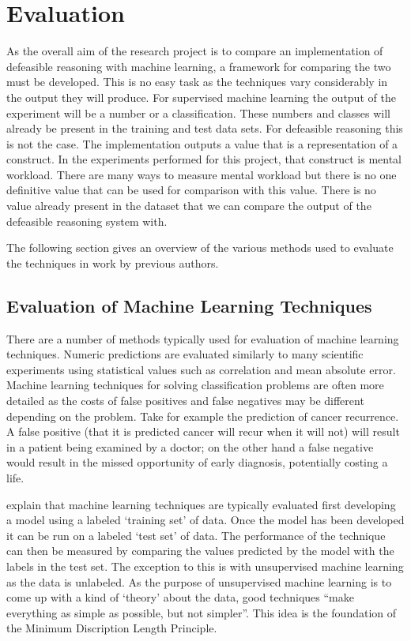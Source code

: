 \section{Evaluation}
\label{sec:evaluation}
As the overall aim of the research project is to compare an implementation of defeasible reasoning with machine learning, a framework for comparing the two must be developed. This is no easy task as the techniques vary considerably in the output they will produce. For supervised machine learning the output of the experiment will be a number or a classification. These numbers and classes will already be present in the training and test data sets. For defeasible reasoning this is not the case. The implementation outputs a value that is a representation of a construct. In the experiments performed for this project, that construct is mental workload. There are many ways to measure mental workload but there is no one definitive value that can be used for comparison with this value. There is no value already present in the dataset that we can compare the output of the defeasible reasoning system with.

The following section gives an overview of the various methods used to evaluate the techniques in work by previous authors.

\subsection{Evaluation of Machine Learning Techniques}

There are a number of methods typically used for evaluation of machine learning techniques. Numeric predictions are evaluated similarly to many scientific experiments using statistical values such as correlation and mean absolute error. Machine learning techniques for solving classification problems are often more detailed as the costs of false positives and false negatives may be different depending on the problem. Take for example the prediction of cancer recurrence. A false positive (that it is predicted cancer will recur when it will not) will result in a patient being examined by a doctor; on the other hand a false negative would result in the missed opportunity of early diagnosis, potentially costing a life.

\cite{witten2005data} explain that machine learning techniques are typically evaluated first developing a model using a labeled `training set' of data. Once the model has been developed it can be run on a labeled `test set' of data. The performance of the technique can then be measured by comparing the values predicted by the model with the labels in the test set. The exception to this is with unsupervised machine learning as the data is unlabeled. As the purpose of unsupervised machine learning is to come up with a kind of `theory' about the data, good techniques ``make everything as simple as possible, but not simpler''. This idea is the foundation of the Minimum Discription Length Principle.

